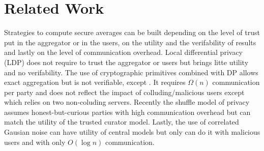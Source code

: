 \section{Related Work}
\label{sec:related}

Strategies to compute secure averages can be built depending on the level of trust put in the aggregator or in the users, on the utility and the verifability of results and lastly on the level of communication overhead.
Local differential privacy (LDP) \cite{Kasiviswanathan2008,d13,kairouz2015secure,Kairouz2016a,discrete_dis_local} does not require to trust the aggregator or users but brings litte utility and no verifability. The use of cryptographic primitives combined with DP \cite{pmlr-v139-kairouz21a,skellam} allows exact aggregation but is not verifiable, except \cite{Dwork2006ourselves}. It requires $\Omega(n)$ communication per party and does not reflect the impact of colluding/malicious users except \cite{Jayaraman2018} which relies on two non-coluding servers. Recently the shuffle model of privacy \cite{Cheu2019,amp_shuffling,Hartmann2019,Balle2020,Ghazi2020ICML} assumes honest-but-curious parties with high communication overhead but can match the utility of the trusted curator model. Lastly, the use of correlated Gausian noise \cite{imtiaz2021distributed, sabater2021accurate} can have utility of central models but only \cite{sabater2021accurate} can do it with malicious users and with only $O(\log n)$ communication.